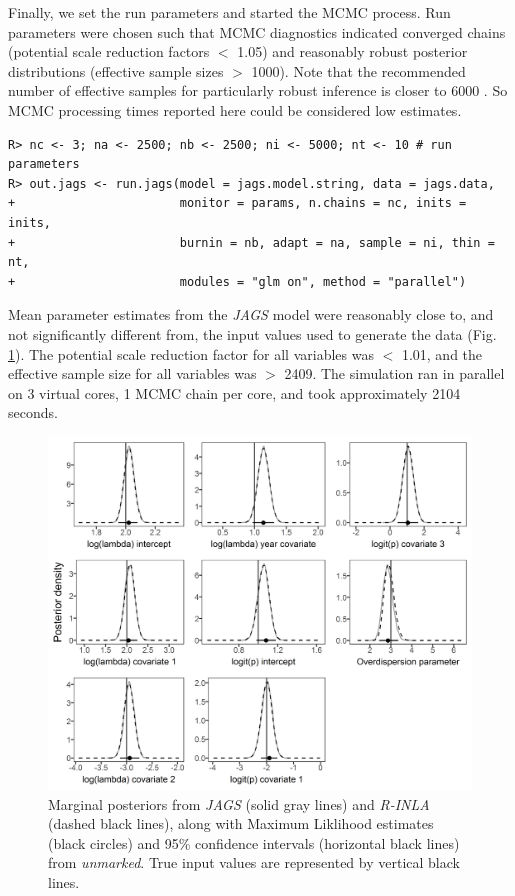 \documentclass{article}
\begin{document}
Finally, we set the run parameters and started the MCMC process. Run parameters were chosen such that MCMC diagnostics indicated converged chains (potential scale reduction factors $<$ 1.05) and reasonably robust posterior distributions (effective sample sizes $>$ 1000). Note that the recommended number of effective samples for particularly robust inference is closer to 6000 \citep{Gong_Flegal_2016}. So MCMC processing times reported here could be considered low estimates.

\begin{verbatim}
R> nc <- 3; na <- 2500; nb <- 2500; ni <- 5000; nt <- 10 # run parameters
R> out.jags <- run.jags(model = jags.model.string, data = jags.data,
+                       monitor = params, n.chains = nc, inits = inits,
+                       burnin = nb, adapt = na, sample = ni, thin = nt,
+                       modules = "glm on", method = "parallel")
\end{verbatim}

Mean parameter estimates from the \emph{JAGS} model were reasonably close to, and not significantly different from, the input values used to generate the data (Fig. \ref{fig:fig1}). The potential scale reduction factor for all variables was $<$ 1.01, and the effective sample size for all variables was $>$ 2409. The simulation ran in parallel on 3 virtual cores, 1 MCMC chain per core, and took approximately 2104 seconds.

\begin{figure}
  \includegraphics[width=\linewidth]{fig1.png}
  \caption{Marginal posteriors from \emph{JAGS} (solid gray lines) and \emph{R-INLA} (dashed black lines), along with Maximum Liklihood estimates (black circles) and 95\% confidence intervals (horizontal black lines) from \emph{unmarked}.  True input values are represented by vertical black lines.}
  \label{fig:fig1}
\end{figure}
\end{document}
